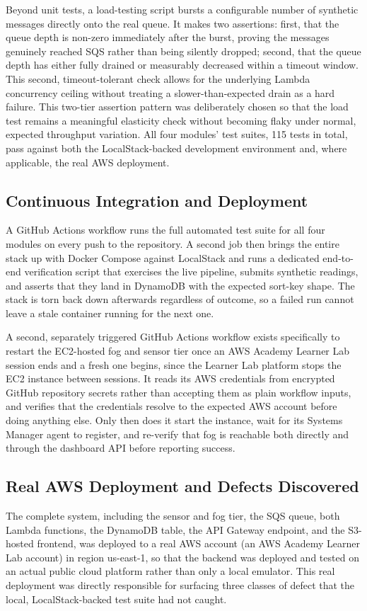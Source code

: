 \documentclass[conference]{IEEEtran}
\begin{document}
Beyond unit tests, a load-testing script bursts a configurable number of synthetic messages directly onto the real queue. It makes two assertions: first, that the queue depth is non-zero immediately after the burst, proving the messages genuinely reached SQS rather than being silently dropped; second, that the queue depth has either fully drained or measurably decreased within a timeout window. This second, timeout-tolerant check allows for the underlying Lambda concurrency ceiling without treating a slower-than-expected drain as a hard failure. This two-tier assertion pattern was deliberately chosen so that the load test remains a meaningful elasticity check without becoming flaky under normal, expected throughput variation. All four modules' test suites, 115 tests in total, pass against both the LocalStack-backed development environment and, where applicable, the real AWS deployment.

\subsection{Continuous Integration and Deployment}
A GitHub Actions workflow runs the full automated test suite for all four modules on every push to the repository. A second job then brings the entire stack up with Docker Compose against LocalStack and runs a dedicated end-to-end verification script that exercises the live pipeline, submits synthetic readings, and asserts that they land in DynamoDB with the expected sort-key shape. The stack is torn back down afterwards regardless of outcome, so a failed run cannot leave a stale container running for the next one.

A second, separately triggered GitHub Actions workflow exists specifically to restart the EC2-hosted fog and sensor tier once an AWS Academy Learner Lab session ends and a fresh one begins, since the Learner Lab platform stops the EC2 instance between sessions. It reads its AWS credentials from encrypted GitHub repository secrets rather than accepting them as plain workflow inputs, and verifies that the credentials resolve to the expected AWS account before doing anything else. Only then does it start the instance, wait for its Systems Manager agent to register, and re-verify that fog is reachable both directly and through the dashboard API before reporting success.

\subsection{Real AWS Deployment and Defects Discovered}
The complete system, including the sensor and fog tier, the SQS queue, both Lambda functions, the DynamoDB table, the API Gateway endpoint, and the S3-hosted frontend, was deployed to a real AWS account (an AWS Academy Learner Lab account) in region us-east-1, so that the backend was deployed and tested on an actual public cloud platform rather than only a local emulator. This real deployment was directly responsible for surfacing three classes of defect that the local, LocalStack-backed test suite had not caught.
\end{document}
